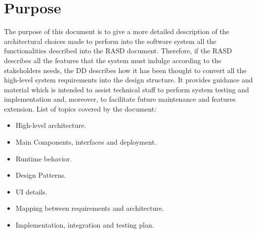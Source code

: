 \section{Purpose}

The purpose of this document is to give a more detailed description of the architectural choices made to perform into the software system all the functionalities described into the RASD document.
Therefore, if the RASD describes all the features that the system must indulge according to the stakeholders needs, the DD describes how it has been thought to convert all the high-level system requirements into the design structure.
It provides guidance and material which is intended to assist technical staff to perform system testing and implementation and, moreover, to facilitate future maintenance and features extension.
List of topics covered by the document:
\begin{itemize}
	\item High-level architecture.
	\item Main Components, interfaces and deployment.
	\item Runtime behavior.
	\item Design Patterns.
	\item UI details.
	\item Mapping between requirements and architecture.
	\item Implementation, integration and testing plan.
\end{itemize}